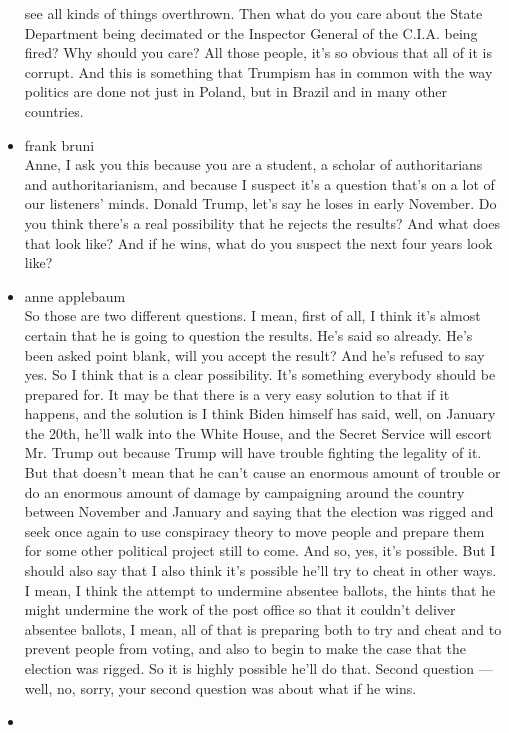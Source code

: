 \begin{itemize}
  see all kinds of things overthrown. Then what do you care about the
  State Department being decimated or the Inspector General of the
  C.I.A. being fired? Why should you care? All those people, it's so
  obvious that all of it is corrupt. And this is something that Trumpism
  has in common with the way politics are done not just in Poland, but
  in Brazil and in many other countries.
\item
  frank bruni\\
  Anne, I ask you this because you are a student, a scholar of
  authoritarians and authoritarianism, and because I suspect it's a
  question that's on a lot of our listeners' minds. Donald Trump, let's
  say he loses in early November. Do you think there's a real
  possibility that he rejects the results? And what does that look like?
  And if he wins, what do you suspect the next four years look like?
\item
  anne applebaum\\
  So those are two different questions. I mean, first of all, I think
  it's almost certain that he is going to question the results. He's
  said so already. He's been asked point blank, will you accept the
  result? And he's refused to say yes. So I think that is a clear
  possibility. It's something everybody should be prepared for. It may
  be that there is a very easy solution to that if it happens, and the
  solution is I think Biden himself has said, well, on January the 20th,
  he'll walk into the White House, and the Secret Service will escort
  Mr. Trump out because Trump will have trouble fighting the legality of
  it. But that doesn't mean that he can't cause an enormous amount of
  trouble or do an enormous amount of damage by campaigning around the
  country between November and January and saying that the election was
  rigged and seek once again to use conspiracy theory to move people and
  prepare them for some other political project still to come. And so,
  yes, it's possible. But I should also say that I also think it's
  possible he'll try to cheat in other ways. I mean, I think the attempt
  to undermine absentee ballots, the hints that he might undermine the
  work of the post office so that it couldn't deliver absentee ballots,
  I mean, all of that is preparing both to try and cheat and to prevent
  people from voting, and also to begin to make the case that the
  election was rigged. So it is highly possible he'll do that. Second
  question --- well, no, sorry, your second question was about what if
  he wins.
\item

\end{itemize}
